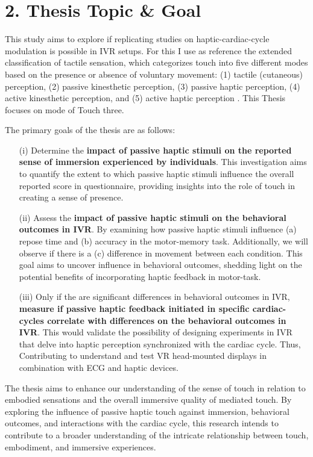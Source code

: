 \documentclass[12pt,oneside,openright]{report}
\begin{document}
\section*{2. Thesis Topic \& Goal}

This study aims to explore if replicating studies on haptic-cardiac-cycle modulation is possible in IVR setups. For this I use as reference the extended classification of tactile sensation, which categorizes touch into five different modes based on the presence or absence of voluntary movement: (1) tactile (cutaneous) perception, (2) passive kinesthetic perception, (3) passive haptic perception, (4) active kinesthetic perception, and (5) active haptic perception \cite{Healy2003HandbookOP}. This Thesis focuses on mode of Touch three. 

The primary goals of the thesis are as follows:
  \begin{itemize}
    \item[(i)] Determine the \textbf{impact of passive haptic stimuli on the reported sense of immersion experienced by individuals}. This investigation aims to quantify the extent to which passive haptic stimuli influence the overall reported score in questionnaire, providing insights into the role of touch in creating a sense of presence.
    \item[(ii)] Assess the \textbf{impact of passive haptic stimuli on the behavioral outcomes in IVR}. By examining how passive haptic stimuli influence (a) repose time and (b) accuracy in the motor-memory task. Additionally, we will observe if there is a (c) difference in movement between each condition. This goal aims to uncover influence in behavioral outcomes, shedding light on the potential benefits of incorporating haptic feedback in motor-task.
    \item[(iii)] Only if the are significant differences in behavioral outcomes in IVR, \textbf{measure if passive haptic feedback initiated in specific cardiac-cycles correlate with differences on the behavioral outcomes in IVR}. This would validate the possibility of designing experiments in IVR that delve into haptic perception synchronized with the cardiac cycle. Thus, Contributing to understand and test VR head-mounted displays in combination with ECG and haptic devices.
  \end{itemize}

  The thesis aims to enhance our understanding of the sense of touch in relation to embodied sensations and the overall immersive quality of mediated touch. By exploring the influence of passive haptic touch against immersion, behavioral outcomes, and interactions with the cardiac cycle, this research intends to contribute to a broader understanding of the intricate relationship between touch, embodiment, and immersive experiences.
\end{document}
